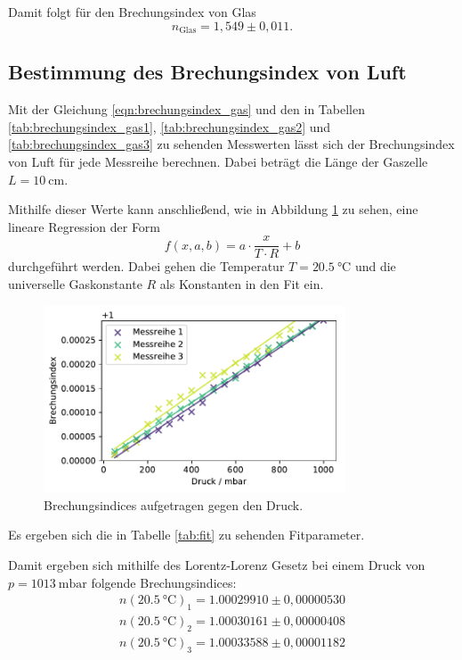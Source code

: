 Damit folgt für den Brechungsindex von Glas
\begin{equation}
    n_\text{Glas} = 1,549 \pm 0,011 .
\end{equation}

\subsection{Bestimmung des Brechungsindex von Luft}
Mit der Gleichung \ref{eqn:brechungsindex_gas} und den in Tabellen \ref{tab:brechungsindex_gas1}, \ref{tab:brechungsindex_gas2} und \ref{tab:brechungsindex_gas3} zu sehenden Messwerten lässt sich der Brechungsindex von Luft für jede Messreihe berechnen. Dabei beträgt die Länge der Gaszelle $L = \SI{10}{\centi \meter}$.



Mithilfe dieser Werte kann anschließend, wie in Abbildung \ref{fig:n} zu sehen,  eine lineare Regression der Form
\begin{equation}
    f(x, a, b) = a \cdot \frac{x}{T \cdot R} + b
    \label{eqn:fit}
\end{equation}
durchgeführt werden. Dabei gehen die Temperatur $T = \SI{20,5}{\celsius} $ und die universelle Gaskonstante $R$ als Konstanten in den Fit ein.
\begin{figure}[H]
    \centering
    \includegraphics[width=0.8\textwidth]{data/Plots/Brechungsindex.pdf}
    \caption{Brechungsindices aufgetragen gegen den Druck. }
    \label{fig:n}
\end{figure}
Es ergeben sich die in Tabelle \ref{tab:fit} zu sehenden Fitparameter.

Damit ergeben sich mithilfe des Lorentz-Lorenz Gesetz bei einem Druck von $p = \SI{1013}{\milli \bar}$ folgende Brechungsindices:
\begin{align}
    n(\SI{20,5}{\celsius} )_\text{1} = 1.00029910 \pm 0,00000530   \\
    n(\SI{20,5}{\celsius} )_\text{2} = 1.00030161 \pm 0,00000408   \\
    n(\SI{20,5}{\celsius} )_\text{3} = 1.00033588 \pm 0,00001182
\end{align}
